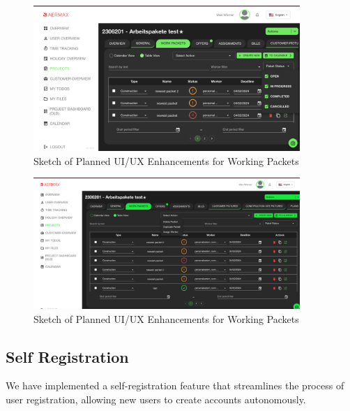 \begin{figure}[H]
    \centering
    \includegraphics[width=0.9\textwidth]{src/assets/chapters/newTable1.png}
    \caption{Sketch of Planned UI/UX Enhancements for Working Packets }
    \label{fig:ui_ux_enhancements}
\end{figure}


\begin{figure}[H]
    \centering
    \includegraphics[width=0.9\textwidth]{src/assets/chapters/newTable2.png}
    \caption{Sketch of Planned UI/UX Enhancements for Working Packets }
    \label{fig:ui_ux_enhancements}
\end{figure}

\subsection{Self Registration}

We have implemented a self-registration feature that streamlines the process of user registration, allowing new users to create accounts autonomously.

